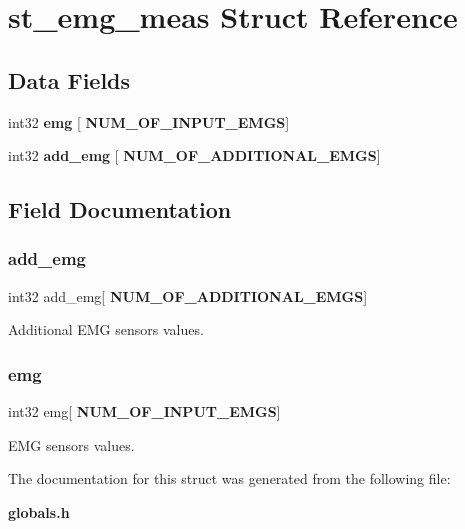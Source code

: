 \section{st\+\_\+emg\+\_\+meas Struct Reference}
\label{structst__emg__meas}
\subsection*{Data Fields}
\begin{DoxyCompactItemize}
\item 
int32 \textbf{ emg} [\textbf{ N\+U\+M\+\_\+\+O\+F\+\_\+\+I\+N\+P\+U\+T\+\_\+\+E\+M\+GS}]
\item 
int32 \textbf{ add\+\_\+emg} [\textbf{ N\+U\+M\+\_\+\+O\+F\+\_\+\+A\+D\+D\+I\+T\+I\+O\+N\+A\+L\+\_\+\+E\+M\+GS}]
\end{DoxyCompactItemize}


\subsection{Field Documentation}
\mbox{\label{structst__emg__meas_aae2276f2b05661a37072d1b95a17774f}} 
\subsubsection{add\+\_\+emg}
{\footnotesize\ttfamily int32 add\+\_\+emg[\textbf{ N\+U\+M\+\_\+\+O\+F\+\_\+\+A\+D\+D\+I\+T\+I\+O\+N\+A\+L\+\_\+\+E\+M\+GS}]}

Additional E\+MG sensors values. \mbox{\label{structst__emg__meas_ae0da72aee09f1465400d8af30b55c1b1}} 
\subsubsection{emg}
{\footnotesize\ttfamily int32 emg[\textbf{ N\+U\+M\+\_\+\+O\+F\+\_\+\+I\+N\+P\+U\+T\+\_\+\+E\+M\+GS}]}

E\+MG sensors values. 

The documentation for this struct was generated from the following file\+:\begin{DoxyCompactItemize}
\item 
\textbf{ globals.\+h}\end{DoxyCompactItemize}
